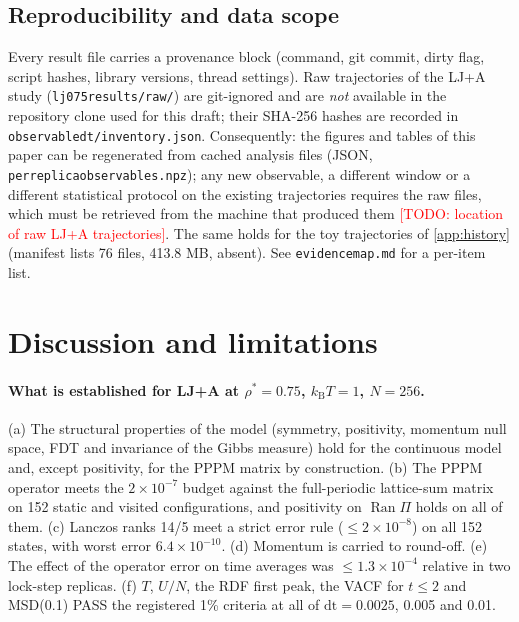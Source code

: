 \documentclass[11pt]{article}
\DeclareRobustCommand{\_}{\textunderscore\allowbreak}
\theoremstyle{remark}
\theoremstyle{definition}
\newcommand{\todo}[1]{\textcolor{red}{[TODO: #1]}}
\newcommand{\kT}{k_{\mathrm B}T}
\newcommand{\Ran}{\operatorname{Ran}}
\begin{document}
\subsection{Reproducibility and data scope}\label{sec:repro}

Every result file carries a provenance block (command, git commit, dirty flag, script hashes, library versions, thread
settings). Raw trajectories of the LJ+A study (\texttt{lj075\_results/raw/}) are git-ignored and are \emph{not} available in the
repository clone used for this draft; their SHA-256 hashes are recorded in \texttt{observable\_dt/inventory.json}. Consequently:
the figures and tables of this paper can be regenerated from cached analysis files (JSON, \texttt{per\_replica\_observables.npz});
any new observable, a different window or a different statistical protocol on the existing trajectories requires the raw files,
which must be retrieved from the machine that produced them \todo{location of raw LJ+A trajectories}. The same holds for the toy
trajectories of \cref{app:history} (manifest lists 76 files, 413.8 MB, absent). See \texttt{evidence\_map.md} for a per-item list.

\section{Discussion and limitations}\label{sec:discussion}

\paragraph{What is established for LJ+A at $\rho^*=0.75$, $\kT=1$, $N=256$.}
(a) The structural properties of the model (symmetry, positivity, momentum null space, FDT and invariance of the Gibbs measure)
hold for the continuous model and, except positivity, for the PPPM matrix by construction. (b) The PPPM operator meets the
$2\times10^{-7}$ budget against the full-periodic lattice-sum matrix on 152 static and visited configurations, and positivity on
$\Ran\Pi$ holds on all of them. (c) Lanczos ranks 14/5 meet a strict error rule ($\le2\times10^{-8}$) on all 152 states, with
worst error $6.4\times10^{-10}$. (d) Momentum is carried to round-off. (e) The effect of the operator error on time averages
was $\le1.3\times10^{-4}$ relative in two lock-step replicas. (f) $T$, $U/N$, the RDF first peak, the VACF for $t\le2$ and MSD(0.1)
PASS the registered 1\% criteria at all of $\mathrm{dt}=0.0025$, 0.005 and 0.01.
\end{document}
